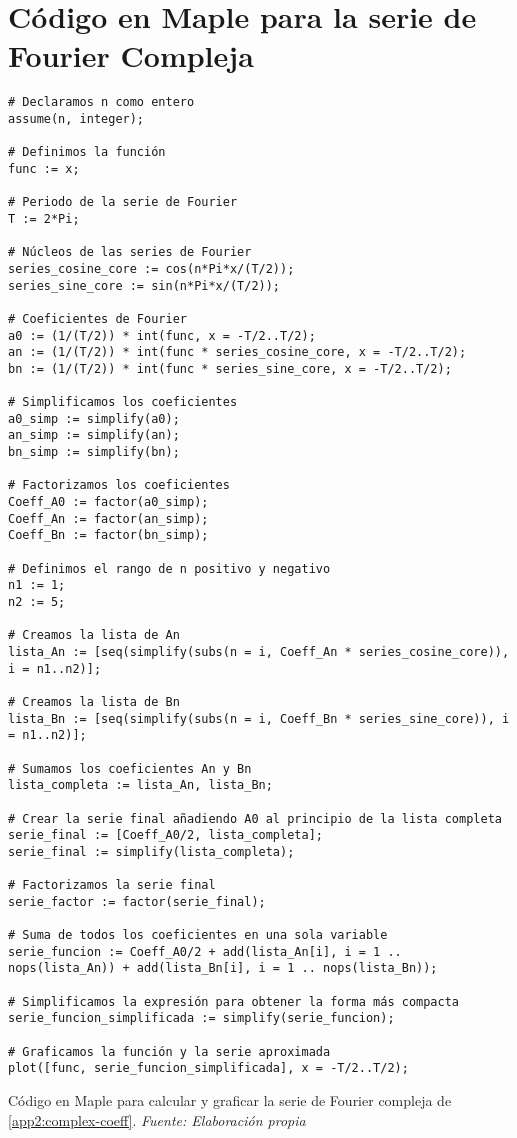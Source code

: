 \section{Código en Maple para la serie de Fourier Compleja}\label{app3:complex-code-maple}
\begin{longlisting}
	\begin{verbatim}
# Declaramos n como entero
assume(n, integer);

# Definimos la función
func := x;

# Periodo de la serie de Fourier
T := 2*Pi;

# Núcleos de las series de Fourier
series_cosine_core := cos(n*Pi*x/(T/2));
series_sine_core := sin(n*Pi*x/(T/2));

# Coeficientes de Fourier
a0 := (1/(T/2)) * int(func, x = -T/2..T/2);
an := (1/(T/2)) * int(func * series_cosine_core, x = -T/2..T/2);
bn := (1/(T/2)) * int(func * series_sine_core, x = -T/2..T/2);

# Simplificamos los coeficientes
a0_simp := simplify(a0);
an_simp := simplify(an);
bn_simp := simplify(bn);

# Factorizamos los coeficientes
Coeff_A0 := factor(a0_simp);
Coeff_An := factor(an_simp);
Coeff_Bn := factor(bn_simp);

# Definimos el rango de n positivo y negativo
n1 := 1;
n2 := 5;

# Creamos la lista de An
lista_An := [seq(simplify(subs(n = i, Coeff_An * series_cosine_core)), i = n1..n2)];

# Creamos la lista de Bn
lista_Bn := [seq(simplify(subs(n = i, Coeff_Bn * series_sine_core)), i = n1..n2)];

# Sumamos los coeficientes An y Bn
lista_completa := lista_An, lista_Bn;

# Crear la serie final añadiendo A0 al principio de la lista completa
serie_final := [Coeff_A0/2, lista_completa];
serie_final := simplify(lista_completa);

# Factorizamos la serie final
serie_factor := factor(serie_final);

# Suma de todos los coeficientes en una sola variable
serie_funcion := Coeff_A0/2 + add(lista_An[i], i = 1 .. nops(lista_An)) + add(lista_Bn[i], i = 1 .. nops(lista_Bn));

# Simplificamos la expresión para obtener la forma más compacta
serie_funcion_simplificada := simplify(serie_funcion);

# Graficamos la función y la serie aproximada
plot([func, serie_funcion_simplificada], x = -T/2..T/2);	
	\end{verbatim}
	\caption[Código en Maple para calcular y graficar la serie de Fourier compleja de \ref{app2:complex-coeff}.] {Código en Maple para calcular y graficar la serie de Fourier compleja de \ref{app2:complex-coeff}. \textit{Fuente: Elaboración propia}} 
\end{longlisting}


